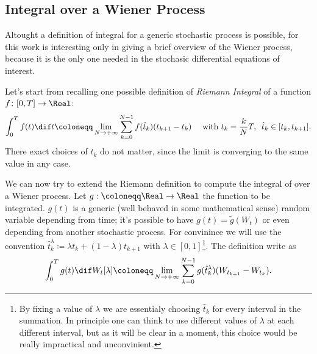 \subsection{Integral over a Wiener Process}
Altought a definition of integral for a generic stochastic process is possible,
for this work is interesting only in giving a brief overview of the Wiener process,
because it is the only one needed in the stochasic differential equations of interest.

Let's start from recalling one possible definition of \emph{Riemann Integral} 
of a function \(f\colon[0,T]\to\Real\):
\[
  \int_0^T f{(t)}\dif t \coloneqq \lim_{N\to+\infty} \sum_{k=0}^{N-1}f{(\hat{t}_k)}(t_{k+1}-t_k)
  \quad \text{ with } t_k = \frac{k}{N}T,\,\,\, \hat{t}_k \in [t_k, t_{k+1}].
\]
There exact choices of \(\hat{t}_k\) do not matter, since the limit is converging 
to the same value in any case.

We can now try to extend the Riemann definition to compute the integral of over a Wiener
process. Let \(g:\coloneqq\Real\to\Real\) the function to be integrated. \(g{(t)}\) is a generic (well behaved in some mathematical sense)
random variable depending from time; it's possible to have \(g{(t)} = \tilde{g}{(W_t)}\) or even depending from another stochastic process.
For convinince we will use the convention 
\(\hat{t}_k^\lambda \coloneqq \lambda t_k + (1-\lambda) t_{k+1}\) with \(\lambda\in[0,1]\)\footnote{
  By fixing a value of \(\lambda\) we are essentialy choosing \(\hat{t}_k\) for every 
  interval in the summation. In principle one can think to use different values of \(\lambda\)
  at each different interval, but as it will be clear in a moment, this choice would be
  really impractical and unconvinient.
}. The definition write as 
\[
  \int_0^T g{(t)}\dif W_t{[\lambda]} \coloneqq \lim_{N\to+\infty} \sum_{k=0}^{N-1}g{(\hat{t}_k^\lambda)}(W_{t_{k+1}}-W_{t_k}).
\]

